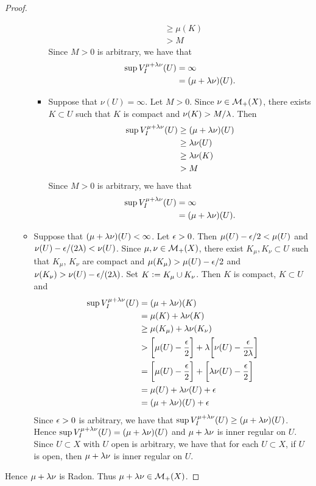 \documentclass{book}
\begin{document}
\begin{proof}
\begin{enumerate}
\begin{itemize}
\begin{itemize}
\begin{align*}
						& \geq \mu(K) \\
						& > M
					\end{align*}
					Since $M > 0$ is arbitrary, we have that 
					\begin{align*}
						\sup V_I^{\mu + \lambda \nu}(U)
						& = \infty \\
						& = (\mu + \lambda \nu)(U).
					\end{align*}
					\item Suppose that $\nu(U) = \infty$. 
					Let $M > 0$. Since $\nu \in \mathcal{M}_+(X)$, there exists $K \subset U$ such that $K$ is compact and $\nu(K) > M/\lambda$. Then 
					\begin{align*}
						\sup V_I^{\mu + \lambda \nu}(U)
						& \geq (\mu + \lambda \nu)(U) \\
						& \geq \lambda \nu(U) \\
						& \geq \lambda \nu(K) \\
						& > M
					\end{align*} 
					Since $M > 0$ is arbitrary, we have that 
					\begin{align*}
						\sup V_I^{\mu + \lambda \nu}(U)
						& = \infty \\
						& = (\mu + \lambda \nu)(U).
					\end{align*}
				\end{itemize}
				\item Suppose that $(\mu + \lambda \nu)(U) < \infty$. Let $\epsilon > 0$. Then $\mu(U) - \epsilon/2 < \mu(U)$ and $\nu(U) - \epsilon/(2 \lambda) < \nu(U)$. Since $\mu, \nu \in \mathcal{M}_+(X)$, there exist $K_{\mu}, K_{\nu} \subset U$ such that $K_{\mu}$, $K_{\nu}$ are compact and $\mu(K_{\mu}) > \mu(U) - \epsilon/2$ and $\nu(K_{\nu}) > \nu(U) - \epsilon/(2 \lambda)$. Set $K \vcentcolon= K_{\mu} \cup K_{\nu}$. Then $K$ is compact, $K \subset U$ and  
				\begin{align*}
					\sup V_I^{\mu + \lambda \nu}(U)
					& = (\mu + \lambda \nu)(K) \\
					& = \mu(K) + \lambda \nu (K) \\
					& \geq \mu(K_{\mu}) + \lambda \nu(K_{\nu}) \\
					& > \bigg[  \mu(U) - \frac{\epsilon}{2} \bigg] + \lambda \bigg[ \nu(U) - \frac{\epsilon}{2 \lambda }\bigg] \\
					& = \bigg[  \mu(U) - \frac{\epsilon}{2} \bigg] + \bigg[  \lambda \nu(U) - \frac{\epsilon}{2} \bigg] \\
					& = \mu(U) + \lambda \nu(U) + \epsilon \\
					& = (\mu + \lambda \nu)(U) + \epsilon  
				\end{align*}
				Since $\epsilon > 0$ is arbitrary, we have that $\sup V_I^{\mu + \lambda \nu}(U) \geq (\mu + \lambda \nu)(U)$. Hence $\sup V_I^{\mu + \lambda \nu}(U) = (\mu + \lambda \nu)(U)$ and $\mu + \lambda \nu$ is inner regular on $U$. Since $U \subset X$ with $U$ open is arbitrary, we have that for each $U \subset X$, if $U$ is open, then $\mu + \lambda \nu$ is inner regular on $U$.
			\end{itemize}
		\end{enumerate}
		Hence $\mu + \lambda \nu$ is Radon. Thus $\mu + \lambda \nu \in \mathcal{M}_+(X)$.
	\end{proof}
\end{document}
